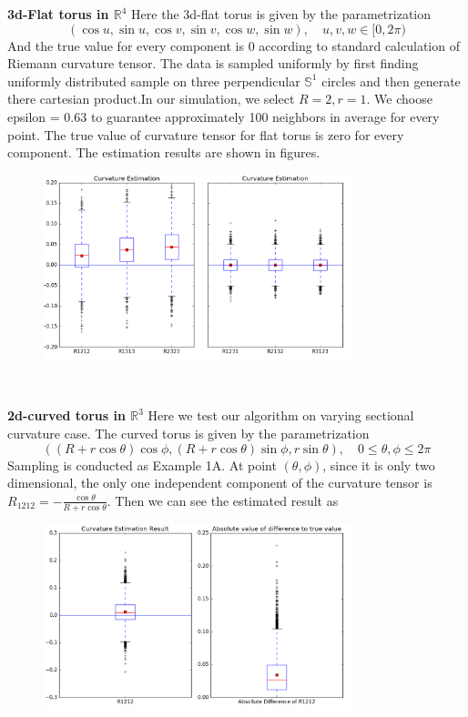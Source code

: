 \documentclass{article}
\begin{document}
\par
\textbf{3d-Flat torus in $\mathbb{R}^4$} Here the 3d-flat torus is given by the parametrization
\begin{equation}
	(\cos u,\sin u,\cos v,\sin v, \cos w,\sin w),\quad u,v,w\in[0,2\pi)
\end{equation}
And the true value for every component is 0 according to standard calculation of Riemann curvature tensor. The data is sampled uniformly by first finding uniformly distributed sample on three perpendicular $\mathbb{S}^1$ circles and then generate there cartesian product.In our simulation, we select $R=2,r=1$. We choose epsilon = $0.63$ to guarantee approximately 100 neighbors in average for every point. The true value of curvature tensor for flat torus is zero for every component. The estimation results are shown in figures.
\begin{figure}[htbp]
\centering
\includegraphics[width=0.8\textwidth]{torus.png}
\end{figure}
\\
\par
\textbf{2d-curved torus in $\mathbb{R}^3$} Here we test our algorithm on varying sectional curvature case. The curved torus is given by the parametrization
\begin{equation}
	((R+r\cos \theta)\cos\phi, (R+r\cos \theta)\sin\phi,r\sin\theta),\quad 0\leq \theta,\phi \leq 2\pi
\end{equation}
Sampling is conducted as \cite{Sample} Example 1A. At point $(\theta,\phi)$, since it is only two dimensional, the only one independent component of the curvature tensor is $R_{1212}=-\frac{\cos \theta}{R+r\cos \theta}$. Then we can see the estimated result as
\begin{figure}[htbp]
\centering
\includegraphics[width=0.8\textwidth]{ctorus.png}
\end{figure}
\end{document}
